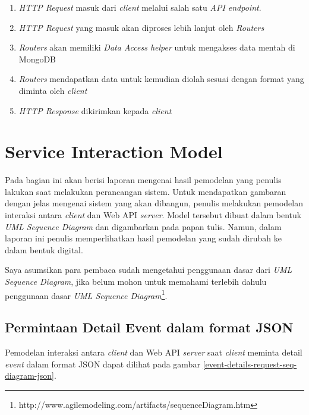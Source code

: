 \documentclass[a4paper, 12pt, oneside]{report}
\begin{document}
\begin{enumerate}
  \item \textit{HTTP Request} masuk dari \textit{client} melalui salah satu \textit{API endpoint}.
  \item \textit{HTTP Request} yang masuk akan diproses lebih lanjut oleh \textit{Routers}
  \item \textit{Routers} akan memiliki \textit{Data Access helper} untuk mengakses data mentah di MongoDB
  \item \textit{Routers} mendapatkan data untuk kemudian diolah sesuai dengan format yang diminta oleh \textit{client}
  \item \textit{HTTP Response} dikirimkan kepada \textit{client}
\end{enumerate}

\section{Service Interaction Model}

\onehalfspacing Pada bagian ini akan berisi laporan mengenai hasil pemodelan yang penulis lakukan saat melakukan perancangan sistem. Untuk mendapatkan gambaran dengan jelas mengenai sistem yang akan dibangun, penulis melakukan pemodelan interaksi antara \textit{client} dan Web API \textit{server}. Model tersebut dibuat dalam bentuk \textit{UML Sequence Diagram} dan digambarkan pada papan tulis. Namun, dalam laporan ini penulis memperlihatkan hasil pemodelan yang sudah dirubah ke dalam bentuk digital.

\onehalfspacing Saya asumsikan para pembaca sudah mengetahui penggunaan dasar dari \textit{UML Sequence Diagram}, jika belum mohon untuk memahami terlebih dahulu penggunaan dasar \textit{UML Sequence Diagram}\footnote{http://www.agilemodeling.com/artifacts/sequenceDiagram.htm}.

\newpage

\subsection{Permintaan Detail Event dalam format JSON}

\onehalfspacing Pemodelan interaksi antara \textit{client} dan Web API \textit{server} saat \textit{client} meminta detail \textit{event} dalam format JSON dapat dilihat pada gambar \ref{event-details-request-seq-diagram-json}.
\end{document}
